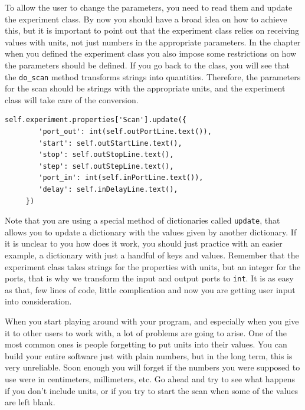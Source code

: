 
To allow the user to change the parameters, you need to read them and
update the experiment class. By now you should have a broad idea on how
to achieve this, but it is important to point out that the experiment
class relies on receiving values with units, not just numbers in the
appropriate parameters. In the chapter when you defined the experiment
class you also impose some restrictions on how the parameters should be
defined. If you go back to the class, you will see that the
\texttt{do_scan} method transforms strings into quantities. Therefore,
the parameters for the scan should be strings with the appropriate
units, and the experiment class will take care of the conversion.

\begin{verbatim}
self.experiment.properties['Scan'].update({
        'port_out': int(self.outPortLine.text()),
        'start': self.outStartLine.text(),
        'stop': self.outStopLine.text(),
        'step': self.outStepLine.text(),
        'port_in': int(self.inPortLine.text()),
        'delay': self.inDelayLine.text(),
     })
\end{verbatim}

Note that you are using a special method of dictionaries called
\texttt{update}, that allows you to update a dictionary with the values
given by another dictionary. If it is unclear to you how does it work,
you should just practice with an easier example, a dictionary with just
a handful of keys and values. Remember that the experiment class takes
strings for the properties with units, but an integer for the ports,
that is why we transform the input and output ports to \texttt{int}. It
is as easy as that, few lines of code, little complication and now you
are getting user input into consideration.

When you start playing around with your program, and especially when you
give it to other users to work with, a lot of problems are going to
arise. One of the most common ones is people forgetting to put units
into their values. You can build your entire software just with plain
numbers, but in the long term, this is very unreliable. Soon enough you
will forget if the numbers you were supposed to use were in centimeters,
millimeters, etc. Go ahead and try to see what happens if you don't
include units, or if you try to start the scan when some of the values
are left blank.

